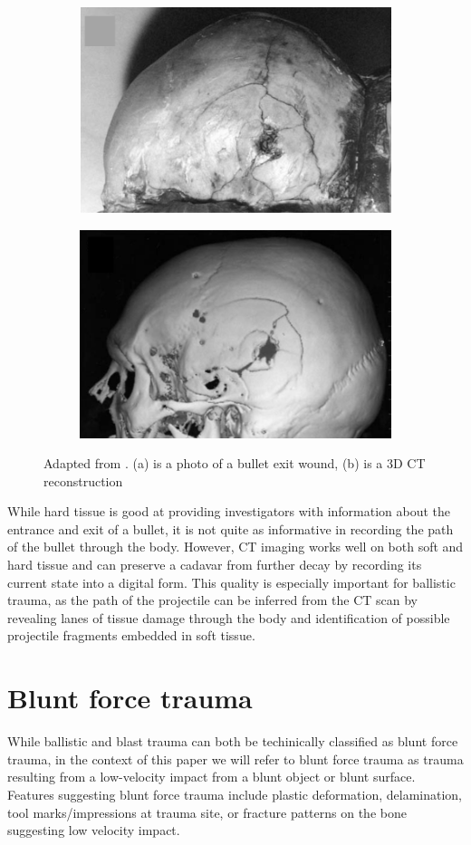 \documentclass[titlepage]{article}
\begin{document}
\begin{figure}[h!]
\centering
\begin{subfigure}{.5\textwidth}
  \centering
  \includegraphics[width=.7\linewidth]{exit}
  \end{subfigure}%
\begin{subfigure}{.5\textwidth}
  \centering
  \includegraphics[width=.7\linewidth]{exit_ct}
\end{subfigure}
\caption{Adapted from \cite{post-imaging}. (a) is a photo of a bullet exit wound, (b) is a 3D CT reconstruction}
\label{fig:exit_wound}
\end{figure}

While hard tissue is good at providing investigators with information about the entrance and exit of a bullet, it is not quite as informative in recording the path of the bullet through the body. However, CT imaging works well on both soft and hard tissue and can preserve a cadavar from further decay by recording its current state into a digital form. This quality is especially important for ballistic trauma, as the path of the projectile can be inferred from the CT scan by revealing lanes of tissue damage through the body and identification of possible projectile fragments embedded in soft tissue.

\newpage
\section{Blunt force trauma}
While ballistic and blast trauma can both be techinically classified as blunt force trauma, in the context of this paper we will refer to blunt force trauma as trauma resulting from a low-velocity impact from a blunt object or blunt surface. Features suggesting blunt force trauma include plastic deformation, delamination, tool marks/impressions at trauma site, or fracture patterns on the bone suggesting low velocity impact.\cite{trauma}
\end{document}
